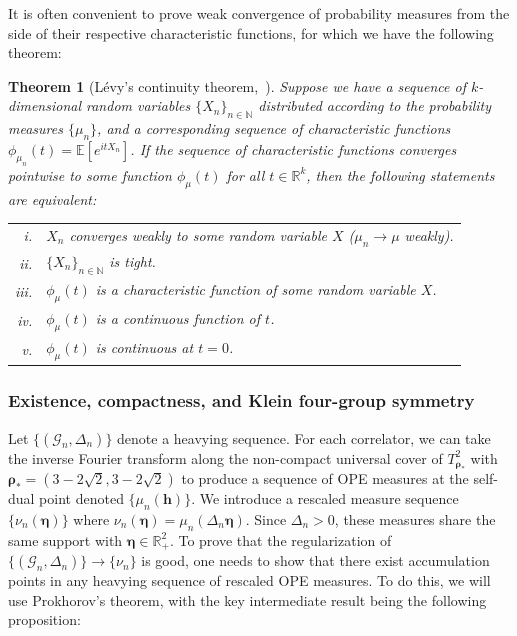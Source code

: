 \documentclass[a4paper,11pt]{article}
\theoremstyle{plain}
\newtheorem{thm}{Theorem}[section]
\theoremstyle{definition}
\theoremstyle{remark}
\newcommand{\bs}[1]{\boldsymbol{#1}}
\newcommand{\De}{\Delta}
\begin{document}
It is often convenient to prove weak convergence of probability measures from the side of their respective characteristic functions, for which we have the following theorem:
\begin{thm}[L\'evy's continuity theorem,~\cite{Williams1991}]
Suppose we have a sequence of $k$-dimensional random variables $\{X_n\}_{n\in\mathbb{N}}$ distributed according to the probability measures $\{\mu_n\}$, and a corresponding sequence of characteristic functions $\phi_{\mu_n}(t) = \mathbb{E}[e^{i tX_n}]$. If the sequence of characteristic functions converges pointwise to some function $\phi_{\mu}(t)$ for all $t \in \mathbb{R}^k$, then the following statements are equivalent:
\begin{center}
\begin{tabular}{rl}
    i. & $X_n$ converges weakly to some random variable $X$ ($\mu_n \to\mu$ weakly).\\[0.5em]
    ii. & $\{X_n\}_{n\in\mathbb{N}}$ is tight. \\[0.5em]
    iii. & $\phi_{\mu}(t)$ is a characteristic function of some random variable $X$.\\[0.5em]
    iv. & $\phi_{\mu}(t)$ is a continuous function of $t$.\\[0.5em]
    v. & $\phi_{\mu}(t)$ is continuous at $t = 0$.
\end{tabular}
\end{center}
\label{levycont}
\end{thm}


\subsubsection{Existence, compactness, and Klein four-group symmetry}

Let $\{(\mathcal{G}_n,\De_n)\}$ denote a heavying sequence. For each correlator, we can take the inverse Fourier transform along the non-compact universal cover of $T^2_{\bs{\rho}_*}$ with $\bs{\rho}_* = (3-2 \sqrt{2},3-2\sqrt{2})$ to produce a sequence of OPE measures at the self-dual point denoted $\{\mu_n(\bs{h})\}$. We introduce a rescaled measure sequence $\{\nu_n(\bs{\eta})\}$ where $\nu_n(\bs{\eta}) = \mu_n(\De_n\bs{\eta})$. Since $\De_n>0$, these measures share the same support with $\bs{\eta} \in \mathbb{R}^2_+$. To prove that the regularization of $\{(\mathcal{G}_n,\De_n)\} \to \{\nu_n\}$ is good, one needs to show that there exist accumulation points in any heavying sequence of rescaled OPE measures. To do this, we will use Prokhorov's theorem, with the key intermediate result being the following proposition:
\end{document}
